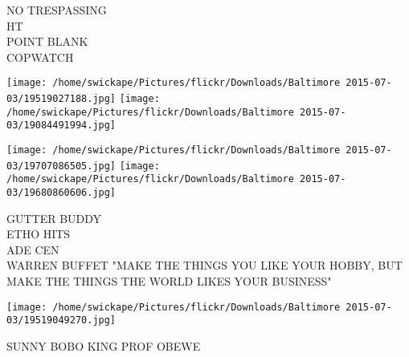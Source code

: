 \documentclass[10pt,letterpaper]{article}
\begin{document}
NO TRESPASSING\\
HT\\
POINT BLANK\\
COPWATCH\\
\pagebreak

\texttt{[image: /home/swickape/Pictures/flickr/Downloads/Baltimore 2015-07-03/19519027188.jpg]}
\texttt{[image: /home/swickape/Pictures/flickr/Downloads/Baltimore 2015-07-03/19084491994.jpg]}

\texttt{[image: /home/swickape/Pictures/flickr/Downloads/Baltimore 2015-07-03/19707086505.jpg]}
\texttt{[image: /home/swickape/Pictures/flickr/Downloads/Baltimore 2015-07-03/19680860606.jpg]}

GUTTER BUDDY\\
ETHO HITS\\
ADE CEN\\
WARREN BUFFET "MAKE THE THINGS YOU LIKE YOUR HOBBY, BUT MAKE THE THINGS THE WORLD LIKES YOUR BUSINESS"\\
\pagebreak

\texttt{[image: /home/swickape/Pictures/flickr/Downloads/Baltimore 2015-07-03/19519049270.jpg]}

SUNNY BOBO KING PROF OBEWE\\
\pagebreak
\end{document}

